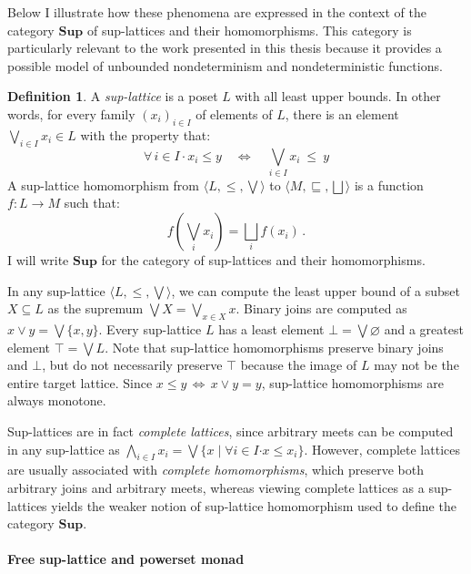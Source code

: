 \documentclass[11pt,oneside]{book}
\theoremstyle{definition}
\newtheorem{definition}[theorem]{Definition}
\newcommand{\bdot}{\boldsymbol{\cdot}}
\begin{document}
Below I illustrate how these phenomena
are expressed in the context of the category $\mathbf{Sup}$
of sup-lattices and their homomorphisms.
This category is particularly relevant
to the work presented in this thesis
because it provides
a possible model of unbounded nondeterminism
and nondeterministic functions.

\begin{definition} %
A \emph{sup-lattice} is a poset $L$
with all least upper bounds.
In other words,
for every family $(x_i)_{i \in I}$
of elements of $L$,
there is an element
$\bigvee_{i \in I} x_i \in L$
with the property that:
\[
  \forall \, i \in I \, \bdot \, x_i \le y
  \quad \Leftrightarrow \quad
  \bigvee_{i \in I} x_i \: \le \: y
\]
A sup-lattice homomorphism
from $\langle L, {\le}, {\bigvee} \rangle$
to $\langle M, {\sqsubseteq}, {\bigsqcup} \rangle$
is a function $f : L \rightarrow M$
such that:
\[
  f \left( \bigvee_i x_i \right) =
  \bigsqcup_i f(x_i)
  \,.
\]
I will write $\mathbf{Sup}$ for
the category of sup-lattices and their homomorphisms.
\end{definition}

In any sup-lattice $\langle L, {\le}, {\bigvee} \rangle$,
we can compute the least upper bound
of a subset $X \subseteq L$
as the supremum $\bigvee X = \bigvee_{x \in X} x$.
Binary joins are computed as $x \vee y = \bigvee \{ x, y \}$.
Every sup-lattice $L$ has
a least element $\bot = \bigvee \varnothing$ and
a greatest element $\top = \bigvee L$.
Note that sup-lattice homomorphisms
preserve binary joins and $\bot$,
but do not necessarily preserve $\top$
because the image of $L$ may not be the entire target lattice.
Since
$x \le y \, \Leftrightarrow \, x \vee y = y$,
sup-lattice homomorphisms are always monotone.

Sup-lattices are in fact \emph{complete lattices},
since arbitrary meets can be computed in any sup-lattice as
$
  \bigwedge_{i \in I} x_i =
  \bigvee \{ x \mid \forall i \in I \bdot x \le x_i \}
$.
However,
complete lattices are usually associated with
\emph{complete homomorphisms},
which preserve both arbitrary joins and arbitrary meets,
whereas viewing complete lattices as a sup-lattices
yields the weaker notion of sup-lattice homomorphism
used to define the category $\mathbf{Sup}$.

\paragraph{Free sup-lattice and powerset monad} %
\end{document}
